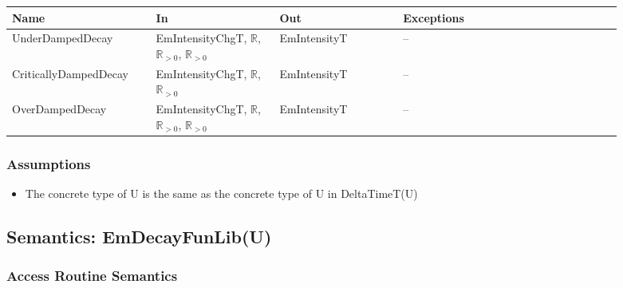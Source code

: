 \begin{center}
    \renewcommand{\arraystretch}{1.2}
    \small
    \begin{tabular}{m{0.21\linewidth} m{0.18\linewidth} m{0.18\linewidth}
            m{0.32\linewidth}}
        \toprule
        \textbf{Name} & \textbf{In} & \textbf{Out} & \textbf{Exceptions} \\
        \midrule

        \rowcolor[gray]{0.9}UnderDampedDecay & EmIntensityChgT, \newline
        $\mathbb{R}$, $\mathbb{R}_{>0}$, $\mathbb{R}_{>0}$ & EmIntensityT & --
        \\

        CriticallyDampedDecay & EmIntensityChgT, \newline $\mathbb{R}$,
        $\mathbb{R}_{>0}$ & EmIntensityT & -- \\

        \rowcolor[gray]{0.9}OverDampedDecay & EmIntensityChgT, \newline
        $\mathbb{R}$, $\mathbb{R}_{>0}$, $\mathbb{R}_{>0}$ & EmIntensityT & --
        \\

        \bottomrule
    \end{tabular}
\end{center}

\subsubsection{Assumptions}
\begin{itemize}
    \item The concrete type of U is the same as the concrete type of U in
    DeltaTimeT(U)
\end{itemize}

\subsection{Semantics: EmDecayFunLib(U)}

\subsubsection{Access Routine Semantics}

